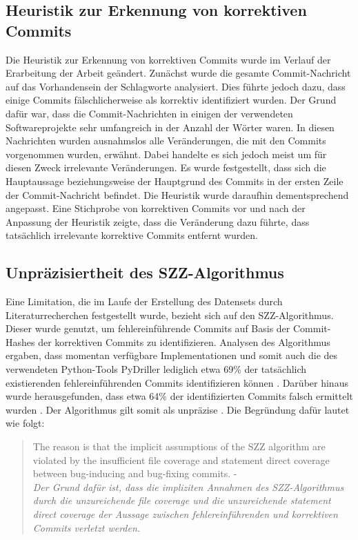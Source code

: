 \subsection*{Heuristik zur Erkennung von korrektiven Commits}
\label{heuristic}

Die Heuristik zur Erkennung von korrektiven Commits wurde im Verlauf der Erarbeitung der Arbeit geändert. Zunächst wurde die gesamte Commit-Nachricht auf das Vorhandensein der Schlagworte analysiert. Dies führte jedoch dazu, dass einige Commits fälschlicherweise als korrektiv identifiziert wurden. Der Grund dafür war, dass die Commit-Nachrichten in einigen der verwendeten Softwareprojekte sehr umfangreich in der Anzahl der Wörter waren. In diesen Nachrichten wurden ausnahmslos alle Veränderungen, die mit den Commits vorgenommen wurden, erwähnt. Dabei handelte es sich jedoch meist um für diesen Zweck irrelevante Veränderungen. Es wurde festgestellt, dass sich die Hauptaussage beziehungsweise der Hauptgrund des Commits in der ersten Zeile der Commit-Nachricht befindet. Die Heuristik wurde daraufhin dementsprechend angepasst. Eine Stichprobe von korrektiven Commits vor und nach der Anpassung der Heuristik zeigte, dass die Veränderung dazu führte, dass tatsächlich irrelevante korrektive Commits entfernt wurden.

\subsection*{Unpräzisiertheit des SZZ-Algorithmus}

Eine Limitation, die im Laufe der Erstellung des Datensets durch Literaturrecherchen festgestellt wurde, bezieht sich auf den SZZ-Algorithmus. Dieser wurde genutzt, um fehlereinführende Commits auf Basis der Commit-Hashes der korrektiven Commits zu identifizieren. Analysen des Algorithmus ergaben, dass momentan verfügbare Implementationen und somit auch die des verwendeten Python-Tools PyDriller lediglich etwa 69\% der tatsächlich existierenden fehlereinführenden Commits identifizieren können \cite{Wen2019}. Darüber hinaus wurde herausgefunden, dass etwa 64\% der identifizierten Commits falsch ermittelt wurden \cite{Wen2019}. Der Algorithmus gilt somit als unpräzise \cite{Wen2019}. Die Begründung dafür lautet wie folgt:

\begin{quotation}
The reason is that the implicit assumptions of the SZZ algorithm
are violated by the insufficient file coverage and statement direct
coverage between bug-inducing and bug-fixing commits. - \cite{Wen2019}
\medskip \\
\textit{Der Grund dafür ist, dass die impliziten Annahmen des SZZ-Algorithmus durch die unzureichende \glqq file coverage\grqq{} und die unzureichende \glqq statement direct
coverage\grqq{} der Aussage zwischen fehlereinführenden und korrektiven Commits verletzt werden.}
\end{quotation}

